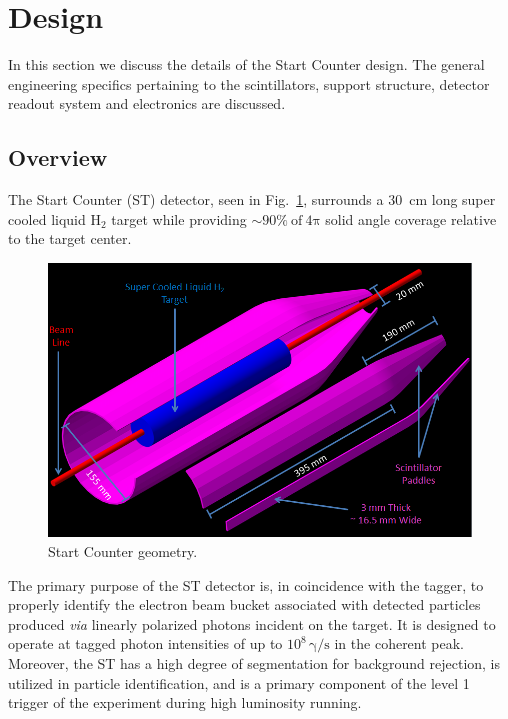 \section{Design} \label{design}

In this section we discuss the details of the \gx{} Start Counter design.  The general engineering specifics pertaining to the scintillators, support structure, detector readout system and electronics are discussed.

\subsection{Overview}
The Start Counter (ST) detector, seen in Fig.~\ref{fig:st-geo}, surrounds a 30~cm long super cooled liquid $\mathrm{H_{2}}$ target while providing $\sim 90 \%\ \mathrm{of\ 4 \pi}$ solid angle coverage relative to the target center.
\begin{figure}[!htb]
	\centering
	\includegraphics[width=1.0\columnwidth]{design/figs/30_Element_Pieces_Removed}
	\caption[Start Counter geometry]{Start Counter geometry.}
	\label{fig:st-geo}
\end{figure}
The primary purpose of the ST detector is, in coincidence with the tagger, to properly identify the electron beam bucket associated with detected particles produced \textit{via} linearly polarized photons incident on the target. It is designed to operate at tagged photon intensities of up to $10^{8}\,\mathrm{\gamma/s}$ in the coherent peak.  Moreover, the ST has a high degree of segmentation for background rejection, is utilized in particle identification, and is a primary component of the level 1 trigger of the \gx{} experiment during high luminosity running\cite{pooser16}.

